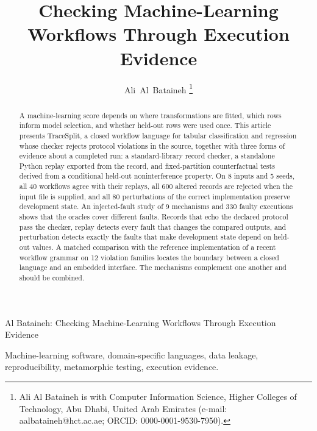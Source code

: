 \documentclass[lettersize,journal]{IEEEtran}
\newcommand{\tool}{TraceSplit}
\begin{document}
\title{Checking Machine-Learning Workflows Through Execution Evidence}
\author{Ali~Al~Bataineh%
\thanks{Ali Al Bataineh is with Computer Information Science, Higher Colleges of Technology, Abu Dhabi, United Arab Emirates (e-mail: aalbataineh@hct.ac.ae; ORCID: 0000-0001-9530-7950).}}

%
{Al Bataineh: Checking Machine-Learning Workflows Through Execution Evidence}

\maketitle

\begin{abstract}
A machine-learning score depends on where transformations are fitted, which rows inform model selection, and whether held-out rows were used once. This article presents \tool{}, a closed workflow language for tabular classification and regression whose checker rejects protocol violations in the source, together with three forms of evidence about a completed run: a standard-library record checker, a standalone Python replay exported from the record, and fixed-partition counterfactual tests derived from a conditional held-out noninterference property. On 8 inputs and 5 seeds, all 40 workflows agree with their replays, all 600 altered records are rejected when the input file is supplied, and all 80 perturbations of the correct implementation preserve development state. An injected-fault study of 9 mechanisms and 330 faulty executions shows that the oracles cover different faults. Records that echo the declared protocol pass the checker, replay detects every fault that changes the compared outputs, and perturbation detects exactly the faults that make development state depend on held-out values. A matched comparison with the reference implementation of a recent workflow grammar on 12 violation families locates the boundary between a closed language and an embedded interface. The mechanisms complement one another and should be combined.
\end{abstract}
\begin{IEEEkeywords}
Machine-learning software, domain-specific languages, data leakage, reproducibility, metamorphic testing, execution evidence.
\end{IEEEkeywords}
\end{document}
